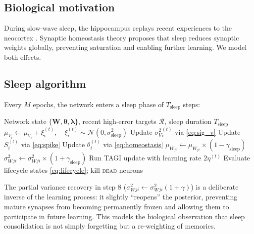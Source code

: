 \documentclass[12pt, a4paper]{article}
\newcommand{\Normal}{\mathcal{N}}
\newcommand{\mW}{\mu_{W}}
\newcommand{\sW}{\sigma^{2}_{W}}
\newcommand{\mV}{\mu_{V}}
\newcommand{\sV}{\sigma^{2}_{V}}
\begin{document}
\subsection{Biological motivation}

During slow-wave sleep, the hippocampus replays recent experiences to the neocortex
\citep{stickgold2005sleep}. Synaptic homeostasis theory \citep{tononi2006sleep}
proposes that sleep reduces synaptic weights globally, preventing saturation and
enabling further learning. We model both effects.

\subsection{Sleep algorithm}

Every $M$ epochs, the network enters a sleep phase of $T_{\text{sleep}}$ steps:

\begin{algorithm}[H]
\caption{Sleep phase consolidation}
\begin{algorithmic}[1]
\Require Network state $\{\bm{W}, \bm{\theta}, \bm{\lambda}\}$, recent high-error targets
    $\mathcal{R}$, sleep duration $T_{\text{sleep}}$
    \State $\mV_i \leftarrow \mV_i + \xi_i^{(t)},\quad \xi_i^{(t)} \sim \Normal(0, \sigma_{\text{sleep}}^2)$
    \State Update $\sV_i^{(t)}$ via \eqref{eq:sig_v}
    \State Update $S_i^{(t)}$ via \eqref{eq:spike}
    \State Update $\theta_i^{(t)}$ via \eqref{eq:homeostasis} 
\EndFor
\State $\mW_{ji} \leftarrow \mW_{ji} \times (1 - \gamma_{\text{sleep}})$
\State $\sW_{ji} \leftarrow \sW_{ji} \times (1 + \gamma_{\text{sleep}})$
    \State Run TAGI update with learning rate $2\eta^{(t)}$
\EndFor
\State Evaluate lifecycle states \eqref{eq:lifecycle}; kill \textsc{dead} neurons
\end{algorithmic}
\end{algorithm}

The partial variance recovery in step 8 ($\sW_{ji} \leftarrow \sW_{ji}(1 + \gamma)$)
is a deliberate inverse of the learning process: it slightly ``reopens'' the posterior,
preventing mature synapses from becoming permanently frozen and allowing them to
participate in future learning. This models the biological observation that sleep
consolidation is not simply forgetting but a re-weighting of memories.
\end{document}
